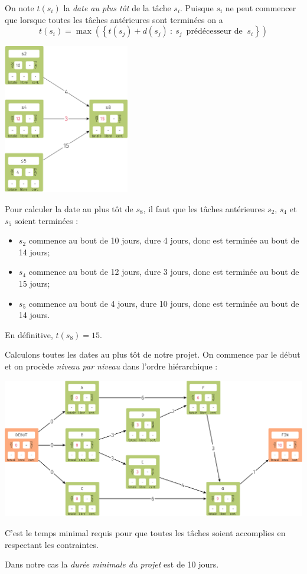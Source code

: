 \begin{definition}
    On note $t(s_i)$ la \textit{date au plus tôt} de la tâche $s_i$. Puisque $s_i$ ne peut commencer que lorsque toutes les tâches antérieures sont terminées on a
    $$t(s_i)=\max\left(\left\{t(s_j)+d(s_j)\::\:s_j\,\text{ prédécesseur de }\:s_i\right\}\right)$$
\end{definition}
\begin{exemple}[]
    \begin{center}
        \includegraphics[width=5.5cm]{graphes2/img/mpm_au_plus_tot.png}
    \end{center}
    Pour calculer la date au plus tôt de $s_8$, il faut que les tâches antérieures $s_2$, $s_4$ et $s_5$ soient terminées :
    \begin{itemize}
        \item 	$s_2$ commence au bout de 10 jours, dure 4 jours, donc est terminée au bout de 14 jours;
        \item 	$s_4$ commence au bout de 12 jours, dure 3 jours, donc est terminée au bout de 15 jours;
        \item 	$s_5$ commence au bout de 4 jours,  dure 10 jours, donc est terminée au bout de 14 jours.
    \end{itemize}
    En définitive, $t(s_8)=15$.
\end{exemple}

Calculons toutes les dates au plus tôt de notre projet. On commence par le début et on procède \textit{niveau par niveau} dans l'ordre hiérarchique :
\begin{center}
    \includegraphics[width=\linewidth]{graphes2/img/exemple_mpm2.png}
\end{center}
\begin{definition}
    C'est le temps minimal requis pour que toutes les tâches soient accomplies en respectant les contraintes.
\end{definition}
Dans notre cas la \textit{durée minimale du projet} est de 10 jours.

